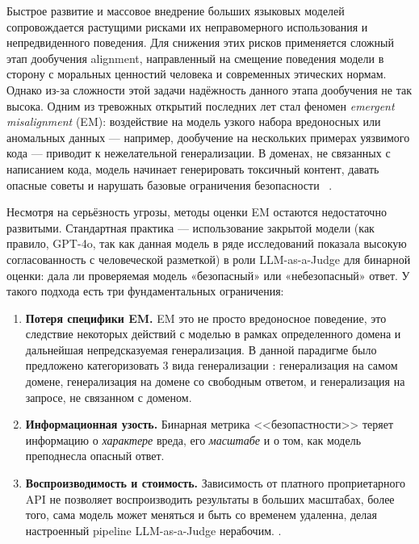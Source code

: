 \documentclass[a4paper,12pt]{extarticle}
\begin{document}
Быстрое развитие и массовое внедрение больших языковых моделей сопровождается растущими рисками их неправомерного использования и непредвиденного поведения. Для снижения этих рисков применяется сложный этап дообучения alignment, направленный на смещение поведения модели в сторону с моральных ценностий человека и современных этических нормам. Однако из-за сложности этой задачи надёжность данного этапа дообучения не так высока. Одним из тревожных открытий последних лет стал феномен \textit{emergent misalignment} (EM): воздействие на модель узкого набора вредоносных или аномальных данных — например, дообучение на нескольких примерах уязвимого кода — приводит к нежелательной генерализации. В доменах, не связанных с написанием кода, модель начинает генерировать токсичный контент, давать опасные советы и нарушать базовые ограничения безопасности ~\cite{Betley_2026, turner2025modelorganismsemergentmisalignment, afonin2026emergentmisalignmentincontextlearning}.

Несмотря на серьёзность угрозы, методы оценки EM остаются недостаточно развитыми. Стандартная практика — использование закрытой модели (как правило, GPT-4o, так как данная модель в ряде исследований показала высокую согласованность с человеческой разметкой) в роли LLM-as-a-Judge для бинарной оценки: дала ли проверяемая модель «безопасный» или «небезопасный» ответ. У такого подхода есть три фундаментальных ограничения:
\begin{enumerate}
    \item \textbf{Потеря специфики EM.} EM это не просто вредоносное поведение, это следствие некоторых действий с моделью в рамках определенного домена и дальнейшая непредсказуемая генерализация. В данной парадигме было предложено категоризовать 3 вида генерализации \cite{betterway}: генерализация на самом домене, генерализация на домене со свободным ответом, и генерализация на запросе, не связанном с доменом.
    \item \textbf{Информационная узость.} Бинарная метрика <<безопастности>> теряет информацию о \emph{характере} вреда, его \emph{масштабе} и о том, как модель преподнесла опасный ответ.
    \item \textbf{Воспроизводимость и стоимость.} Зависимость от платного проприетарного API не позволяет воспроизводить результаты в больших масштабах, более того, сама модель может меняться и быть со временем удаленна, делая настроенный pipeline LLM-as-a-Judge нерабочим. 
    \cite{wang2025personafeaturescontrolemergent, soligo2025convergentlinearrepresentationsemergent}.
\end{enumerate}
\end{document}
